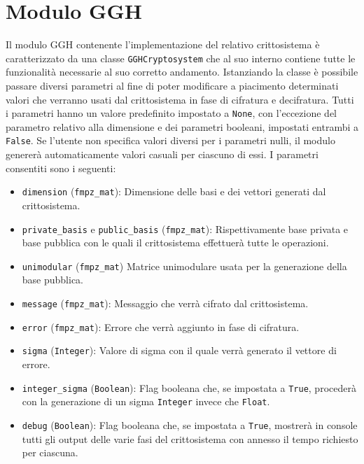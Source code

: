 \section{Modulo GGH}
\label{sec:moduloggh}

Il modulo GGH contenente l'implementazione del relativo crittosistema è caratterizzato
da una classe \texttt{GGHCryptosystem} che al suo interno contiene tutte le funzionalità
necessarie al suo corretto andamento. Istanziando la classe è possibile passare 
diversi parametri al fine di poter modificare a piacimento determinati valori 
che verranno usati dal crittosistema in fase di cifratura e decifratura.
Tutti i parametri hanno un valore predefinito impostato a \texttt{None}, con l'eccezione del 
parametro relativo alla dimensione e dei parametri booleani, impostati entrambi a \texttt{False}. 
Se l'utente non specifica valori diversi per i parametri nulli, il modulo genererà automaticamente valori casuali per ciascuno 
di essi. I parametri consentiti sono i seguenti:
\begin{itemize}
    \item \texttt{dimension} (\texttt{fmpz\_mat}): 
    Dimensione delle basi e dei vettori generati dal crittosistema.
    \item \texttt{private\_basis} e \texttt{public\_basis} (\texttt{fmpz\_mat}): 
    Rispettivamente base privata e base pubblica con le quali il crittosistema effettuerà 
    tutte le operazioni.
    \item \texttt{unimodular} (\texttt{fmpz\_mat})
    Matrice unimodulare usata per la generazione della base pubblica. 
    \item \texttt{message} (\texttt{fmpz\_mat}): 
    Messaggio che verrà cifrato dal crittosistema.
    \item \texttt{error} (\texttt{fmpz\_mat}): 
    Errore che verrà aggiunto in fase di cifratura.
    \item \texttt{sigma} (\texttt{Integer}): 
    Valore di sigma con il quale verrà generato il vettore di errore. 
    \item \texttt{integer\_sigma} (\texttt{Boolean}): 
    Flag booleana che, se impostata a \texttt{True}, procederà con la generazione di un sigma
    \texttt{Integer} invece che \texttt{Float}.
    \item \texttt{debug} (\texttt{Boolean}): 
    Flag booleana che, se impostata a \texttt{True}, 
    mostrerà in console tutti gli output delle varie fasi del crittosistema con annesso 
    il tempo richiesto per ciascuna. 
\end{itemize}

